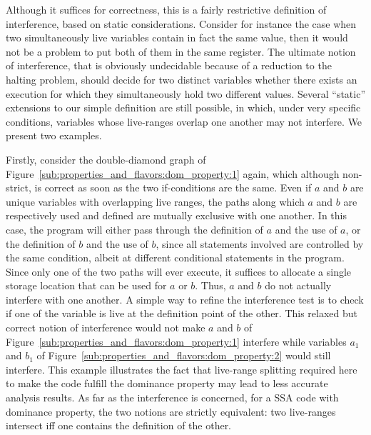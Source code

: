 Although it suffices for correctness, this is a fairly restrictive definition of interference, based on static considerations. 
Consider for instance the case when two simultaneously live variables contain in fact the same value, then it would not be a problem to put both of them in the same register. 
The ultimate notion of interference, that is obviously undecidable because of a reduction to the halting problem, should decide for two distinct variables whether there exists an execution for which they simultaneously hold two different values. 
Several ``static'' extensions to our simple definition are still possible, in which, under very specific conditions, variables whose live-ranges overlap one another may not interfere. 
We present two examples.

Firstly, consider the double-diamond graph of Figure~\ref{sub:properties_and_flavors:dom_property:1} again, which although non-strict, is correct as soon as the two if-conditions are the same. 
Even if $a$ and $b$ are unique variables with overlapping live ranges, the paths along which $a$ and $b$ are respectively used and defined are mutually exclusive with one another. 
In this case, the program will either pass through the definition of $a$ and the use of $a$, or the definition of $b$ and the use of $b$, since all statements involved are controlled by the same condition, albeit at different conditional statements in the program. 
Since only one of the two paths will ever execute, it suffices to allocate a single storage location that can be used for $a$ or $b$. 
Thus, $a$ and $b$ do not actually interfere with one another. 
A simple way to refine the interference test is to check if one of the variable is live at the definition point of the other. 
This relaxed but correct notion of interference would not make $a$ and $b$ of Figure~\ref{sub:properties_and_flavors:dom_property:1} interfere while variables $a_1$ and $b_1$ of Figure~\ref{sub:properties_and_flavors:dom_property:2} would still interfere. 
This example illustrates the fact that live-range splitting required here to make the code fulfill the dominance property may lead to less accurate analysis results. 
As far as the interference is concerned, for a SSA code with dominance property, the two notions are strictly equivalent: 
two live-ranges intersect iff one contains the definition of the other.


